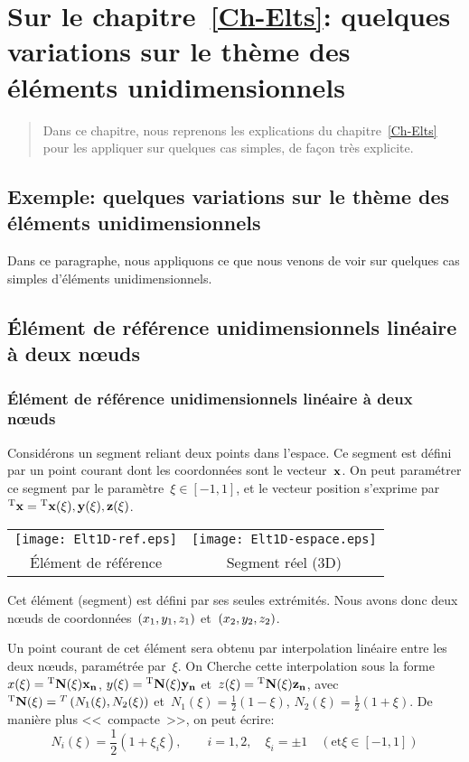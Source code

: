 \ifVersionAvecExemplesSepares
  \chapter{Sur le chapitre~\ref{Ch-Elts}: quelques variations sur le thème des éléments unidimensionnels}
  \begin{abstract}
  Dans ce chapitre, nous reprenons les explications du chapitre~\ref{Ch-Elts} pour les appliquer
  sur quelques cas simples, de façon très explicite.
  \end{abstract}
\else
  \section{Exemple: quelques variations sur le thème des éléments unidimensionnels}

  Dans ce paragraphe, nous appliquons ce que nous venons de voir sur quelques cas simples d'éléments unidimensionnels.
\fi

\medskipvm
\ifVersionAvecExemplesSepares
  \section{Élément de référence unidimensionnels linéaire à deux nœuds}\label{Sec-Elt1D2}
\else
  \subsection{Élément de référence unidimensionnels linéaire à deux nœuds}\label{Sec-Elt1D2}
\fi

Considérons un segment reliant deux points dans l'espace.
Ce segment est défini par un point courant dont les coordonnées sont le vecteur~$\VV{x}$.
On peut paramétrer ce segment par le paramètre~$\xi \in [-1,1]$, et le vecteur
position s'exprime par~${}^\mathrm{T}\mathbf{x}={}^\mathrm{T}\mathbf{x(\xi), y(\xi), z(\xi)}$.
\begin{table}[ht]\centering\small
\begin{tabular}{cc}
\texttt{[image: Elt1D-ref.eps]} &
\texttt{[image: Elt1D-espace.eps]} \\
Élément de référence & Segment réel (3D)
\end{tabular}
\end{table}
\ifVersionDuDocEstVincent

\medskipvm\fi
Cet élément (segment) est défini par ses seules extrémités. Nous avons donc deux
nœuds de coordonnées~$\left(x_1, y_1, z_1\right)$ et~$\left(x_2, y_2, z_2\right)$.\ifVersionDuDocEstVincent\par\fi
Un point courant de cet élément sera obtenu par interpolation linéaire entre les deux nœuds,
paramétrée par~$\xi$. On Cherche cette interpolation sous la forme~$x(\xi)=\LL{N(\xi)}\VV{x_n}$, $y(\xi)=\LL{N(\xi)}\VV{y_n}$ et~$z(\xi)=\LL{N(\xi)}\VV{z_n}$, avec
${}^\mathrm{T}\mathbf{N(\xi)}={}^T\left( N_1(\xi), N_2(\xi)\right)$ et~$N_1(\xi)=\frac12 (1-\xi)$, $N_2(\xi)=\frac12(1+\xi)$.
De manière plus <<~compacte~>>, on peut écrire:
\begin{equation} N_i(\xi)=\frac12(1+\xi_i\xi), \qquad i=1,2, \quad \xi_i=\pm1 \quad (\text{et} \xi\in[-1,1]) \end{equation}
\ifVersionDuDocEstVincent

